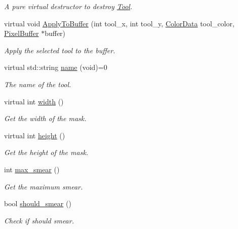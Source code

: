 \begin{DoxyCompactItemize}
\begin{DoxyCompactList}\small\item\em A pure virtual destructor to destroy \hyperlink{classimage__tools_1_1Tool}{Tool}. \end{DoxyCompactList}\item 
virtual void \hyperlink{classimage__tools_1_1Tool_a5427081ae4c0a20427bad3deb39e5857}{Apply\+To\+Buffer} (int tool\+\_\+x, int tool\+\_\+y, \hyperlink{classimage__tools_1_1ColorData}{Color\+Data} tool\+\_\+color, \hyperlink{classimage__tools_1_1PixelBuffer}{Pixel\+Buffer} $\ast$buffer)
\begin{DoxyCompactList}\small\item\em Apply the selected tool to the buffer. \end{DoxyCompactList}\item 
virtual std\+::string \hyperlink{classimage__tools_1_1Tool_a251c179e3ac9756d08fbcd082750f8a9}{name} (void)=0
\begin{DoxyCompactList}\small\item\em The name of the tool. \end{DoxyCompactList}\item 
virtual int \hyperlink{classimage__tools_1_1Tool_a70a671fbda82c746468e1a0c5c898c08}{width} ()
\begin{DoxyCompactList}\small\item\em Get the width of the mask. \end{DoxyCompactList}\item 
virtual int \hyperlink{classimage__tools_1_1Tool_ae1a7d1d03e2128da512ef20c294bfca9}{height} ()
\begin{DoxyCompactList}\small\item\em Get the height of the mask. \end{DoxyCompactList}\item 
int \hyperlink{classimage__tools_1_1Tool_adc29d68691b4d2013c9814cd79cfd36f}{max\+\_\+smear} ()
\begin{DoxyCompactList}\small\item\em Get the maximum smear. \end{DoxyCompactList}\item 
bool \hyperlink{classimage__tools_1_1Tool_a3247e5e36cb8aa534bc751ca30bef954}{should\+\_\+smear} ()
\begin{DoxyCompactList}\small\item\em Check if should smear. \end{DoxyCompactList}\end{DoxyCompactItemize}

